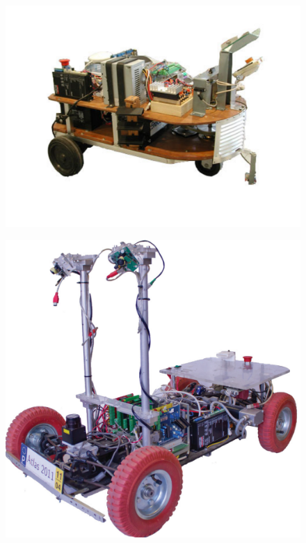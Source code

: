 \begin{figure}[!h]
	\centering
		\begin{minipage}[t]{0.32\textwidth}
			\includegraphics[width=\textwidth]{./figure/modelosatlas1.pdf}
			\label{fig:modelosatlas1}
		\end{minipage}
		\begin{minipage}[t]{0.32\textwidth}
			\includegraphics[width=\textwidth]{./figure/modelosatlas2.pdf}

\end{minipage}
\end{figure}
